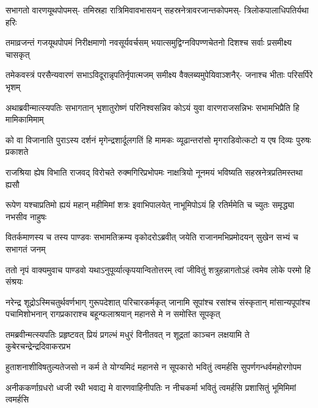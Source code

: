 \fourlineindentedshloka
{सभागतो वारणयूथपोपमस्-}
{तमिस्रहा रात्रिमिवावभासयन्}
{सहस्रनेत्रावरजान्तकोपमस्-}
{त्रिलोकपालाधिपतिर्यथा हरिः}


\fourlineindentedshloka
{तमाव्रजन्तं गजयूथपोपमं}
{निरीक्षमाणो नवसूर्यवर्चसम्}
{भयात्समुद्विग्नविपण्णचेतनो}
{दिशश्च सर्वाः प्रसमीक्ष्य चासकृत्}


\fourlineindentedshloka
{तमेकवस्त्रं परसैन्यवारणं}
{सभाऽविदूरान्नृपतिर्नृपात्मजम्}
{समीक्ष्य वैक्लब्यमुपेयिवाञ्शनैर्-}
{जनाश्च भीताः परिसर्पिरे भृशम्}


\fourlineindentedshloka
{अथाब्रवीन्मात्स्यपतिः सभागतान्}
{भृशातुरोष्णं परिनिश्वसन्निव}
{कोऽयं युवा वारणराजसन्निभः}
{सभामभिप्रैति हि मामिकामिमाम्}


\fourlineindentedshloka
{को वा विजानाति पुराऽस्य दर्शनं}
{मृगेन्द्रशार्दूलगतिं हि मामकः}
{व्यूढान्तरांसो मृगराडिवोत्कटो}
{य एष दिव्यः पुरुषः प्रकाशते}


\fourlineindentedshloka
{राजश्रिया ह्येष विभाति राजवद्}
{विरोचते रुक्मगिरिप्रभोपमः}
{नाक्षत्रियो नूनमयं भविष्यति}
{सहस्रनेत्रप्रतिमस्तथा ह्यसौ}


\fourlineindentedshloka
{रूपेण यश्चाप्रतिमो ह्ययं महान्}
{महीमिमां शत्रः इवाभिपालयेत्}
{नाभूमिपोऽयं हि रतिर्ममेति च}
{च्युतः समृद्ध्या नभसीव नाहुषः}



\fourlineindentedshloka
{वितर्कमाणस्य च तस्य पाण्डवः}
{सभामतिक्रम्य वृकोदरोऽब्रवीत्}
{जयेति राजानमभिप्रमोदयन्}
{सुखेन सभ्यं च सभागतं जनम्}


\fourlineindentedshloka
{ततो नृपं वाक्यमुवाच पाण्डवो}
{यथाऽनुपूर्व्यात्कृपयान्वितोत्तरम्}
{त्वां जीवितुं शत्रुहन्नागतोऽहं}
{त्वमेव लोके परमो हि संश्रयः}


\sixlineindentedshloka
{नरेन्द्र शूद्रोऽस्मिचतुर्थवर्णभाग्}
{गुरूपदेशात् परिचारकर्मकृत्}
{जानामि सूपांश्च रसांश्च संस्कृतान्}
{मांसान्यपूपांश्च पचामिशोभनान्}
{रागप्रकाराश्च बहून्फलाश्रयान्}
{महानसे मे न समोस्ति सूपकृत्}



\fourlineindentedshloka
{तमब्रवीन्मत्स्यपतिः प्रहृष्टवत्}
{प्रियं प्रगल्भं मधुरं विनीतवत्}
{न शूद्रतां काञ्चन लक्षयामि ते}
{कुबेरचन्द्रेन्द्रदिवाकरप्रभ}


\fourlineindentedshloka
{हुताशनाशीविषतुल्यतेजसो}
{न कर्म ते योग्यमिदं महानसे}
{न सूपकारो भवितुं त्वमर्हसि}
{सुपर्णगन्धर्वमहोरगोपम}


\fourlineindentedshloka
{अनीककर्णाग्रधरो ध्वजी रथी}
{भवाद्य मे वारणवाहिनीपतिः}
{न नीचकर्मा भवितुं त्वमर्हसि}
{प्रशासितुं भूमिमिमां त्वमर्हसि}


